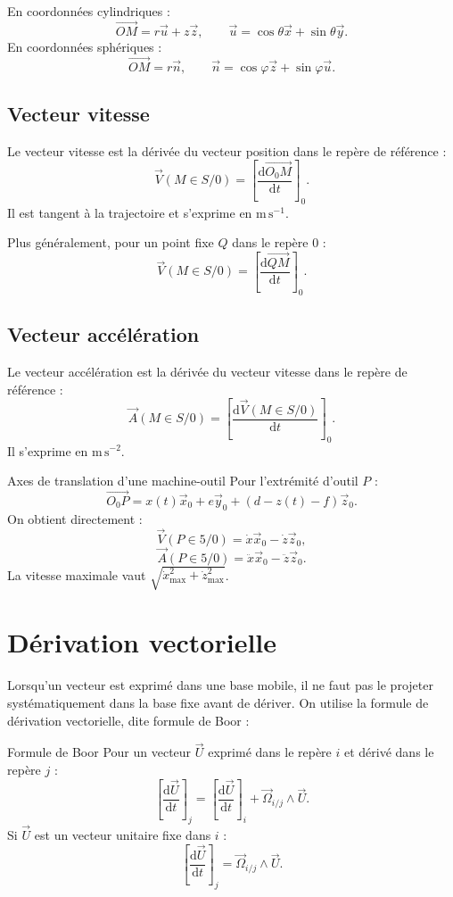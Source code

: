 En coordonnées cylindriques :
\[
\overrightarrow{OM}=r\vec u+z\vec z,
\qquad
\vec u=\cos\theta\vec x+\sin\theta\vec y.
\]
En coordonnées sphériques :
\[
\overrightarrow{OM}=r\vec n,
\qquad
\vec n=\cos\varphi\vec z+\sin\varphi\vec u.
\]

\subsection{Vecteur vitesse}

Le vecteur vitesse est la dérivée du vecteur position dans le repère de
référence :
\[
\boxed{\vec V(M\in S/0)
=\left[\frac{\mathrm d\overrightarrow{O_0M}}{\mathrm dt}\right]_0.}
\]
Il est tangent à la trajectoire et s'exprime en
$\mathrm{m\,s^{-1}}$.

Plus généralement, pour un point fixe $Q$ dans le repère 0 :
\[
\vec V(M\in S/0)
=\left[\frac{\mathrm d\overrightarrow{QM}}{\mathrm dt}\right]_0.
\]

\subsection{Vecteur accélération}

Le vecteur accélération est la dérivée du vecteur vitesse dans le repère
de référence :
\[
\boxed{\vec A(M\in S/0)
=\left[\frac{\mathrm d\vec V(M\in S/0)}{\mathrm dt}\right]_0.}
\]
Il s'exprime en $\mathrm{m\,s^{-2}}$.

\begin{TLCineApp}{Axes de translation d'une machine-outil}
Pour l'extrémité d'outil $P$ :
\[
\overrightarrow{O_0P}
=x(t)\vec x_0+e\vec y_0+(d-z(t)-f)\vec z_0.
\]
On obtient directement :
\[
\vec V(P\in5/0)=\dot x\vec x_0-\dot z\vec z_0,
\]
\[
\vec A(P\in5/0)=\ddot x\vec x_0-\ddot z\vec z_0.
\]
La vitesse maximale vaut
$\sqrt{\dot x_{\max}^2+\dot z_{\max}^2}$.
\end{TLCineApp}

\section{Dérivation vectorielle}
\label{sec:cine-derivation}

Lorsqu'un vecteur est exprimé dans une base mobile, il ne faut pas le
projeter systématiquement dans la base fixe avant de dériver. On utilise
la formule de dérivation vectorielle, dite formule de Boor :

\begin{TLCineDef}{Formule de Boor}
Pour un vecteur $\vec U$ exprimé dans le repère $i$ et dérivé dans le
repère $j$ :
\[
\boxed{
\left[\frac{\mathrm d\vec U}{\mathrm dt}\right]_j
=\left[\frac{\mathrm d\vec U}{\mathrm dt}\right]_i
+\vec\Omega_{i/j}\wedge\vec U.}
\]
Si $\vec U$ est un vecteur unitaire fixe dans $i$ :
\[
\left[\frac{\mathrm d\vec U}{\mathrm dt}\right]_j
=\vec\Omega_{i/j}\wedge\vec U.
\]
\end{TLCineDef}

